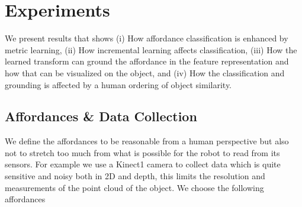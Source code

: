 \section{Experiments}\label{experiments}

We present results that shows (i) How affordance classification is
enhanced by metric learning, (ii) How incremental learning affects
classification, (iii) How the learned transform can ground the
affordance in the feature representation and how that can be visualized
on the object, and (iv) How the classification and grounding is affected
by a human ordering of object similarity.

\subsection{Affordances \& Data
Collection}\label{affordances-data-collection}

We define the affordances to be reasonable from a human perspective but
also not to stretch too much from what is possible for the robot to read
from its sensors. For example we use a Kinect1 camera to collect data
which is quite sensitive and noisy both in 2D and depth, this limits the
resolution and measurements of the point cloud of the object. We choose
the following affordances

\small

